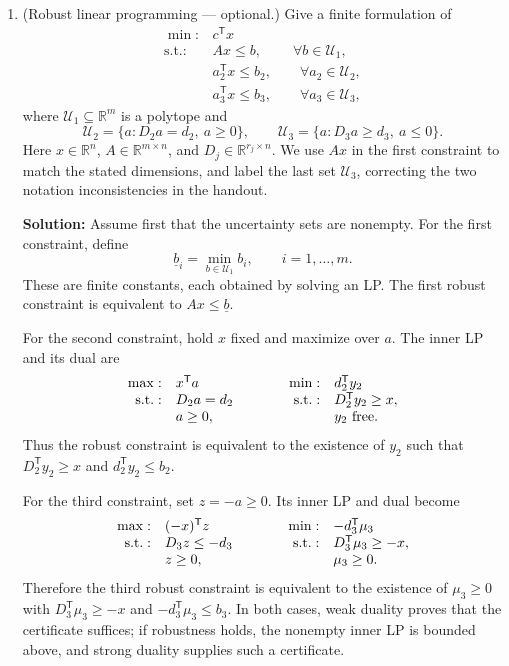 \documentclass[11pt]{article}
\newcommand{\R}{\mathbb R}
\newcommand{\T}{^{\mathsf T}}
\newcommand{\solution}{\par\medskip\noindent\textbf{Solution:} }
\begin{document}
\begin{enumerate}
\item (Robust linear programming --- optional.) Give a finite formulation of
\[
\begin{array}{rl}
\min:&c\T x\\
\text{s.t.}:&Ax\le b,\qquad\ \forall b\in\mathcal U_1,\\
&a_2\T x\le b_2,\qquad\forall a_2\in\mathcal U_2,\\
&a_3\T x\le b_3,\qquad\forall a_3\in\mathcal U_3,
\end{array}
\]
where $\mathcal U_1\subseteq\R^m$ is a polytope and
\[
\mathcal U_2=\{a:D_2a=d_2,\ a\ge0\},\qquad
\mathcal U_3=\{a:D_3a\ge d_3,\ a\le0\}.
\]
Here $x\in\R^n$, $A\in\R^{m\times n}$, and
$D_j\in\R^{r_j\times n}$. We use $Ax$ in the first constraint to match
the stated dimensions, and label the last set $\mathcal U_3$, correcting
the two notation inconsistencies in the handout.

\solution Assume first that the uncertainty sets are nonempty.
For the first constraint, define
\[
\underline b_i=\min_{b\in\mathcal U_1}b_i,\qquad i=1,\ldots,m.
\]
These are finite constants, each obtained by solving an LP. The first
robust constraint is equivalent to $Ax\le\underline b$.

For the second constraint, hold $x$ fixed and maximize over $a$.
The inner LP and its dual are
\[
\begin{array}{rl@{\qquad\qquad}rl}
\max:&x\T a&\min:&d_2\T y_2\\
\text{s.t.}:&D_2a=d_2&\text{s.t.}:&D_2\T y_2\ge x,\\
&a\ge0,&&y_2\text{ free}.
\end{array}
\]
Thus the robust constraint is equivalent to the existence of $y_2$ such
that $D_2\T y_2\ge x$ and $d_2\T y_2\le b_2$.

For the third constraint, set $z=-a\ge0$. Its inner LP and dual become
\[
\begin{array}{rl@{\qquad\qquad}rl}
\max:&(-x)\T z&\min:&-d_3\T\mu_3\\
\text{s.t.}:&D_3z\le-d_3&\text{s.t.}:&D_3\T\mu_3\ge-x,\\
&z\ge0,&&\mu_3\ge0.
\end{array}
\]
Therefore the third robust constraint is equivalent to the existence
of $\mu_3\ge0$ with $D_3\T\mu_3\ge-x$ and $-d_3\T\mu_3\le b_3$.
In both cases, weak duality proves that the certificate suffices;
if robustness holds, the nonempty inner LP is bounded above, and strong
duality supplies such a certificate.


\end{enumerate}
\end{document}
